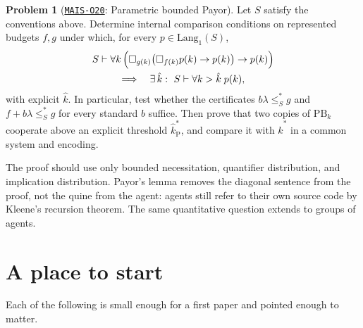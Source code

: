 \documentclass[11pt]{amsart}
\newcommand{\Oid}[1]{\href{https://github.com/lionellevine/MAIS/blob/main/open-problems/MAIS-O#1.md}{\texttt{MAIS-O#1}}}
\theoremstyle{plain}
\theoremstyle{definition}
\newtheorem{problem}[theorem]{Problem}
\newcommand{\Lang}{\mathrm{Lang}}
\newcommand{\leSstar}{\mathrel{\leq_S^{*}}}
\begin{document}
\begin{problem}[\Oid{20}: Parametric bounded Payor]
\label{prob:payor}
Let $S$ satisfy the conventions above. Determine internal comparison conditions on represented budgets $f,g$ under which, for every $p\in\Lang_1(S)$,
\begin{multline*}
S \vdash \forall k\,\Bigl(
  \Box_{g(k)}\bigl(\Box_{f(k)}p(k)\to p(k)\bigr)\to p(k)
\Bigr)\\
\Longrightarrow\quad
\exists\,\hat{k}:\ S\vdash\forall k>\hat{k}\;p(k),
\end{multline*}
with explicit $\hat{k}$. In particular, test whether the certificates $b\lambda\leSstar g$ and $f+b\lambda\leSstar g$ for every standard $b$ suffice. Then prove that two copies of $\mathrm{PB}_k$ cooperate above an explicit threshold $\hat{k}^{*}_{\mathrm P}$, and compare it with $\hat{k}^{*}$ in a common system and encoding.
\end{problem}

The proof should use only bounded necessitation, quantifier distribution, and implication distribution. Payor's lemma removes the diagonal sentence from the proof, not the quine from the agent: agents still refer to their own source code by Kleene's recursion theorem. The same quantitative question extends to groups of agents.

\section{A place to start}
\label{sec:start}

Each of the following is small enough for a first paper and pointed enough to matter.
\end{document}
